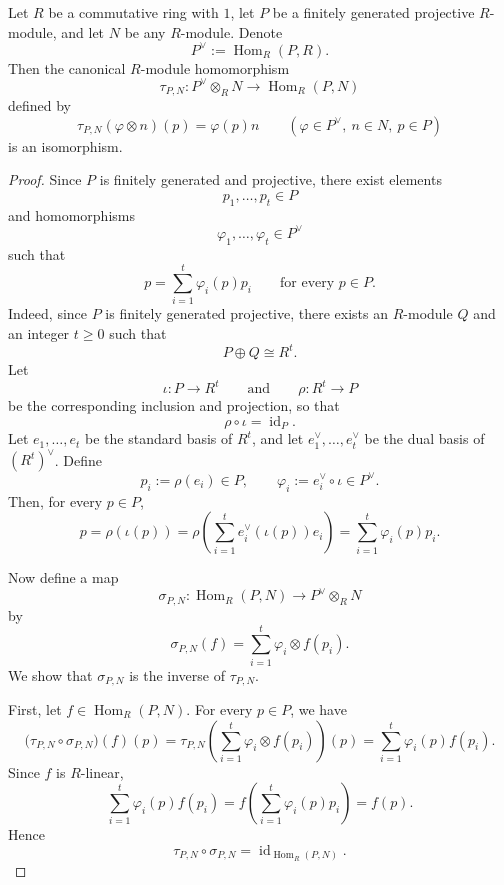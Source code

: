 \begin{corollary}
    Let $R$ be a commutative ring with $1$, let $P$ be a finitely generated projective
    $R$-module, and let $N$ be any $R$-module. Denote
    \[
        P^{\vee}:=\operatorname{Hom}_R(P,R).
    \]
    Then the canonical $R$-module homomorphism
    \[
        \tau_{P,N}:P^{\vee}\otimes_R N\longrightarrow \operatorname{Hom}_R(P,N)
    \]
    defined by
    \[
        \tau_{P,N}(\varphi\otimes n)(p)=\varphi(p)n
        \qquad
        (\varphi\in P^\vee,\ n\in N,\ p\in P)
    \]
    is an isomorphism.
\end{corollary}

\begin{proof}
    Since $P$ is finitely generated and projective, there exist elements
    \[
        p_1,\dots,p_t\in P
    \]
    and homomorphisms
    \[
        \varphi_1,\dots,\varphi_t\in P^\vee
    \]
    such that
    \[
        p=\sum_{i=1}^t \varphi_i(p)p_i
        \qquad
        \text{for every }p\in P.
    \]
    Indeed, since $P$ is finitely generated projective, there exists an $R$-module $Q$
    and an integer $t\geq 0$ such that
    \[
        P\oplus Q\cong R^t.
    \]
    Let
    \[
        \iota:P\longrightarrow R^t
        \qquad\text{and}\qquad
        \rho:R^t\longrightarrow P
    \]
    be the corresponding inclusion and projection, so that
    \[
        \rho\circ \iota=\operatorname{id}_P.
    \]
    Let $e_1,\dots,e_t$ be the standard basis of $R^t$, and let
    $e_1^\vee,\dots,e_t^\vee$ be the dual basis of $(R^t)^\vee$. Define
    \[
        p_i:=\rho(e_i)\in P,
        \qquad
        \varphi_i:=e_i^\vee\circ \iota\in P^\vee.
    \]
    Then, for every $p\in P$,
    \[
        p
        =
        \rho(\iota(p))
        =
        \rho\left(\sum_{i=1}^t e_i^\vee(\iota(p))e_i\right)
        =
        \sum_{i=1}^t \varphi_i(p)p_i.
    \]

    Now define a map
    \[
        \sigma_{P,N}:\operatorname{Hom}_R(P,N)\longrightarrow P^\vee\otimes_R N
    \]
    by
    \[
        \sigma_{P,N}(f)
        =
        \sum_{i=1}^t \varphi_i\otimes f(p_i).
    \]
    We show that $\sigma_{P,N}$ is the inverse of $\tau_{P,N}$.

    First, let $f\in \operatorname{Hom}_R(P,N)$. For every $p\in P$, we have
    \[
        \bigl(\tau_{P,N}\circ \sigma_{P,N}\bigr)(f)(p)
        =
        \tau_{P,N}\left(\sum_{i=1}^t \varphi_i\otimes f(p_i)\right)(p)
        =
        \sum_{i=1}^t \varphi_i(p)f(p_i).
    \]
    Since $f$ is $R$-linear,
    \[
        \sum_{i=1}^t \varphi_i(p)f(p_i)
        =
        f\left(\sum_{i=1}^t \varphi_i(p)p_i\right)
        =
        f(p).
    \]
    Hence
    \[
        \tau_{P,N}\circ \sigma_{P,N}
        =
        \operatorname{id}_{\operatorname{Hom}_R(P,N)}.
    \]


\end{proof}
